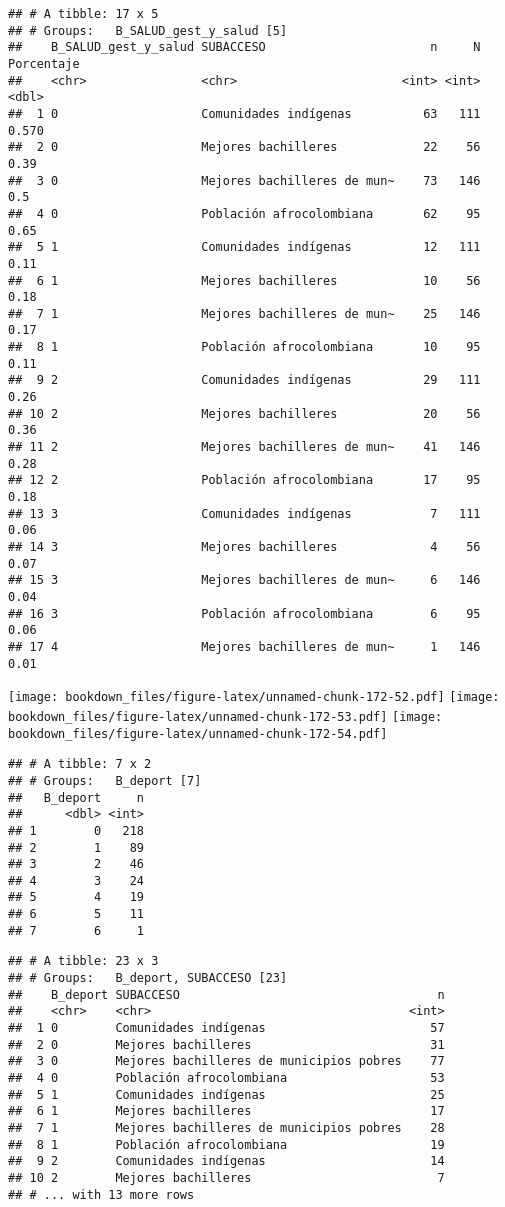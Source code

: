 \documentclass[]{article}
\theoremstyle{definition}
\theoremstyle{definition}
\theoremstyle{definition}
\theoremstyle{remark}
\begin{document}
\begin{verbatim}
## # A tibble: 17 x 5
## # Groups:   B_SALUD_gest_y_salud [5]
##    B_SALUD_gest_y_salud SUBACCESO                       n     N Porcentaje
##    <chr>                <chr>                       <int> <int>      <dbl>
##  1 0                    Comunidades indígenas          63   111      0.570
##  2 0                    Mejores bachilleres            22    56      0.39 
##  3 0                    Mejores bachilleres de mun~    73   146      0.5  
##  4 0                    Población afrocolombiana       62    95      0.65 
##  5 1                    Comunidades indígenas          12   111      0.11 
##  6 1                    Mejores bachilleres            10    56      0.18 
##  7 1                    Mejores bachilleres de mun~    25   146      0.17 
##  8 1                    Población afrocolombiana       10    95      0.11 
##  9 2                    Comunidades indígenas          29   111      0.26 
## 10 2                    Mejores bachilleres            20    56      0.36 
## 11 2                    Mejores bachilleres de mun~    41   146      0.28 
## 12 2                    Población afrocolombiana       17    95      0.18 
## 13 3                    Comunidades indígenas           7   111      0.06 
## 14 3                    Mejores bachilleres             4    56      0.07 
## 15 3                    Mejores bachilleres de mun~     6   146      0.04 
## 16 3                    Población afrocolombiana        6    95      0.06 
## 17 4                    Mejores bachilleres de mun~     1   146      0.01
\end{verbatim}

\texttt{[image: bookdown\_files/figure-latex/unnamed-chunk-172-52.pdf]}
\texttt{[image: bookdown\_files/figure-latex/unnamed-chunk-172-53.pdf]}
\texttt{[image: bookdown\_files/figure-latex/unnamed-chunk-172-54.pdf]}

\begin{verbatim}
## # A tibble: 7 x 2
## # Groups:   B_deport [7]
##   B_deport     n
##      <dbl> <int>
## 1        0   218
## 2        1    89
## 3        2    46
## 4        3    24
## 5        4    19
## 6        5    11
## 7        6     1
\end{verbatim}

\begin{verbatim}
## # A tibble: 23 x 3
## # Groups:   B_deport, SUBACCESO [23]
##    B_deport SUBACCESO                                    n
##    <chr>    <chr>                                    <int>
##  1 0        Comunidades indígenas                       57
##  2 0        Mejores bachilleres                         31
##  3 0        Mejores bachilleres de municipios pobres    77
##  4 0        Población afrocolombiana                    53
##  5 1        Comunidades indígenas                       25
##  6 1        Mejores bachilleres                         17
##  7 1        Mejores bachilleres de municipios pobres    28
##  8 1        Población afrocolombiana                    19
##  9 2        Comunidades indígenas                       14
## 10 2        Mejores bachilleres                          7
## # ... with 13 more rows
\end{verbatim}
\end{document}
